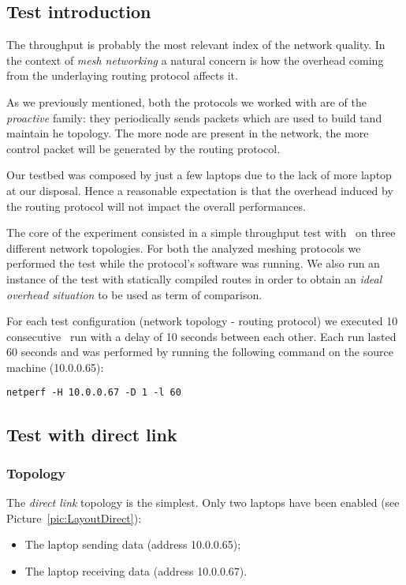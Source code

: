 \subsection{Test introduction}

    The throughput is probably the most relevant index of the network
    quality. In the context of \emph{mesh networking} a natural concern
    is how the overhead coming from the underlaying routing protocol
    affects it.

    As we previously mentioned, both the protocols we worked
    with are of the \emph{proactive} family: they periodically sends
    packets which are used to build tand maintain he topology. The
    more node are present in the network, the more control packet will
    be generated by the routing protocol.

    Our testbed was composed by just a few laptops due to the lack of
    more laptop at our disposal. Hence a reasonable expectation is
    that the overhead induced by the routing protocol will not impact
    the overall performances.

    The core of the experiment consisted in a simple throughput test with
    \netperf\ on three different network topologies. For both the
    analyzed meshing protocols we performed the test while the protocol's
    software was running. We also run an instance of the test with
    statically compiled routes in order to obtain an \emph{ideal overhead
    situation} to be used as term of comparison.

    For each test configuration (network topology - routing protocol) we
    executed 10 consecutive \netperf\ run with a delay of 10 seconds
    between each other. Each run lasted 60 seconds and was performed by
    running the following  command on the source machine (10.0.0.65):
\begin{verbatim}
netperf -H 10.0.0.67 -D 1 -l 60
\end{verbatim}

\subsection{Test with direct link}

\subsubsection{Topology}
        The \emph{direct link} topology is the simplest. Only two laptops
        have been enabled (see Picture~\ref{pic:LayoutDirect}):
        \begin{itemize}
        \item   The laptop sending data (address 10.0.0.65);
        \item   The laptop receiving data (address 10.0.0.67).
        \end{itemize}

